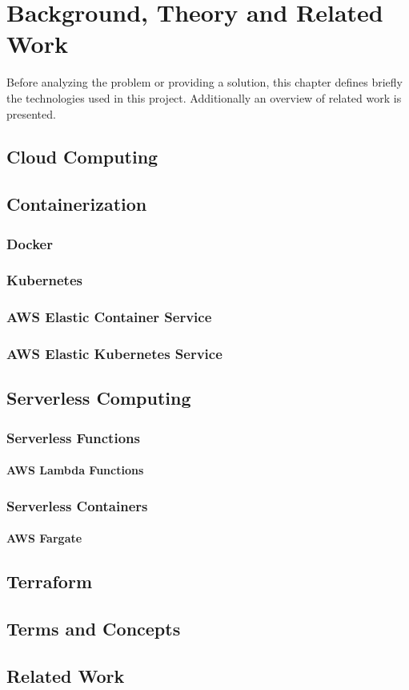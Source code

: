\part{Background, Theory and Related Work}

Before analyzing the problem or providing a solution,
this chapter defines briefly the technologies used in this project.
Additionally an overview of related work is presented.

\chapter{Cloud Computing}

\chapter{Containerization}
\section{Docker}
\section{Kubernetes}
\section{AWS Elastic Container Service}
\section{AWS Elastic Kubernetes Service}

\chapter{Serverless Computing}
\section{Serverless Functions}
\subsection{AWS Lambda Functions}
\section{Serverless Containers}
\subsection{AWS Fargate}

\chapter{Terraform}

\chapter{Terms and Concepts}

\chapter{Related Work}

